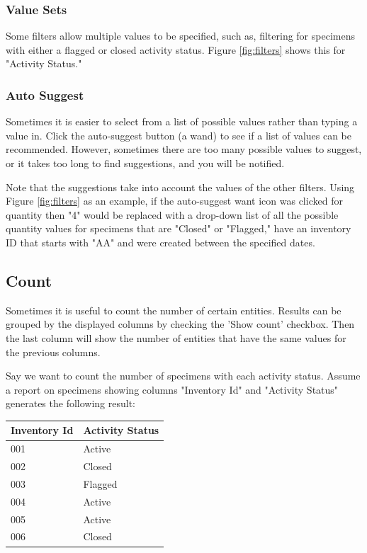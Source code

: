 \subsubsection{Value Sets}

Some filters allow multiple values to be specified, such as, filtering for specimens with either a flagged or closed activity status. Figure \ref{fig:filters} shows this for "Activity Status."

\subsubsection{Auto Suggest}

Sometimes it is easier to select from a list of possible values rather than typing a value in. Click the auto-suggest button (a wand) to see if a list of values can be recommended. However, sometimes there are too many possible values to suggest, or it takes too long to find suggestions, and you will be notified.

Note that the suggestions take into account the values of the other filters. Using Figure \ref{fig:filters} as an example, if the auto-suggest want icon was clicked for quantity then "4" would be replaced with a drop-down list of all the possible quantity values for specimens that are "Closed" or "Flagged," have an inventory ID that starts with "AA" and were created between the specified dates.

\subsection{Count}

Sometimes it is useful to count the number of certain entities. Results can be grouped by the displayed columns by checking the 'Show count' checkbox. Then the last column will show the number of entities that have the same values for the previous columns.

Say we want to count the number of specimens with each activity status. Assume a report on specimens showing columns "Inventory Id" and "Activity Status" generates the following result:

\begin{tabular}{| l | l |}
  \hline
  Inventory Id & Activity Status \\ \hline
  001 & Active \\ \hline
  002 & Closed \\ \hline
  003 & Flagged \\ \hline
  004 & Active \\ \hline
  005 & Active \\ \hline
  006 & Closed \\ \hline
\end{tabular}

